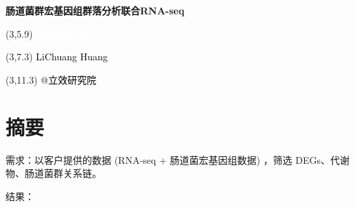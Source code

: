 \documentclass[
]{article}
\author{}
\date{\vspace{-2.5em}}
\begin{document}
\begin{titlepage} 
\begin{center} \textbf{\Huge
肠道菌群宏基因组群落分析联合RNA-seq} \vspace{4em}
\begin{textblock}{10}(3,5.9) \huge
\textbf{\textcolor{white}{2024-01-30}}
\end{textblock} \begin{textblock}{10}(3,7.3)
\Large \textcolor{black}{LiChuang Huang}
\end{textblock} \begin{textblock}{10}(3,11.3)
\Large \textcolor{black}{@立效研究院}
\end{textblock} \end{center} \end{titlepage}
\restoregeometry


\tableofcontents

\listoffigures

\listoftables

\newpage


\hypertarget{abstract}{%
\section{摘要}\label{abstract}}

需求：以客户提供的数据 (RNA-seq + 肠道菌宏基因组数据) ，筛选 DEGs、代谢物、肠道菌群关系链。

结果：
\end{document}
